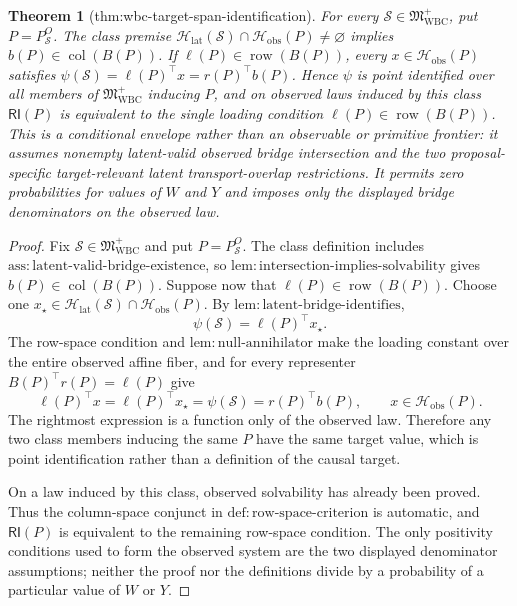 \documentclass{article}
\newtheorem{theorem}{Theorem}
\begin{document}
\begin{theorem}[thm:wbc-target-span-identification]\label{thm:wbc-target-span-identification}
For every \(\mathcal S\in\mathfrak M_{\mathrm{WBC}}^{+}\), put \(P=P_{\mathcal S}^O\). The class premise \(\mathcal H_{\mathrm{lat}}(\mathcal S)\cap\mathcal H_{\mathrm{obs}}(P)\neq\varnothing\) implies \(b(P)\in\operatorname{col}(B(P))\). If \(\ell(P)\in\operatorname{row}(B(P))\), every \(x\in\mathcal H_{\mathrm{obs}}(P)\) satisfies \(\psi(\mathcal S)=\ell(P)^{\top}x=r(P)^{\top}b(P)\). Hence \(\psi\) is point identified over all members of \(\mathfrak M_{\mathrm{WBC}}^{+}\) inducing \(P\), and on observed laws induced by this class \(\mathsf{RI}(P)\) is equivalent to the single loading condition \(\ell(P)\in\operatorname{row}(B(P))\). This is a conditional envelope rather than an observable or primitive frontier: it assumes nonempty latent-valid observed bridge intersection and the two proposal-specific target-relevant latent transport-overlap restrictions. It permits zero probabilities for values of \(W\) and \(Y\) and imposes only the displayed bridge denominators on the observed law.
\end{theorem}
\begin{proof}
Fix \(\mathcal S\in\mathfrak M_{\mathrm{WBC}}^+\) and put
\(P=P_{\mathcal S}^O\).  The class definition includes
\(\mathrm{ass{:}latent\text{-}valid\text{-}bridge\text{-}existence}\), so
\(\mathrm{lem{:}intersection\text{-}implies\text{-}solvability}\) gives
\(b(P)\in\operatorname{col}(B(P))\).  Suppose now that
\(\ell(P)\in\operatorname{row}(B(P))\).  Choose one
\(x_\star\in\mathcal H_{\mathrm{lat}}(\mathcal S)\cap
\mathcal H_{\mathrm{obs}}(P)\).  By
\(\mathrm{lem{:}latent\text{-}bridge\text{-}identifies}\),
\[
 \psi(\mathcal S)=\ell(P)^\top x_\star.
\]
The row-space condition and \(\mathrm{lem{:}null\text{-}annihilator}\) make the
loading constant over the entire observed affine fiber, and for every representer
\(B(P)^\top r(P)=\ell(P)\) give
\[
 \ell(P)^\top x=\ell(P)^\top x_\star
 =\psi(\mathcal S)=r(P)^\top b(P),
 \qquad x\in\mathcal H_{\mathrm{obs}}(P).
\]
The rightmost expression is a function only of the observed law.  Therefore any
two class members inducing the same \(P\) have the same target value, which is
point identification rather than a definition of the causal target.

On a law induced by this class, observed solvability has already been proved.
Thus the column-space conjunct in
\(\mathrm{def{:}row\text{-}space\text{-}criterion}\) is automatic, and
\(\mathsf{RI}(P)\) is equivalent to the remaining row-space condition.  The only
positivity conditions used to form the observed system are the two displayed
denominator assumptions; neither the proof nor the definitions divide by a
probability of a particular value of \(W\) or \(Y\).
\end{proof}
\end{document}
